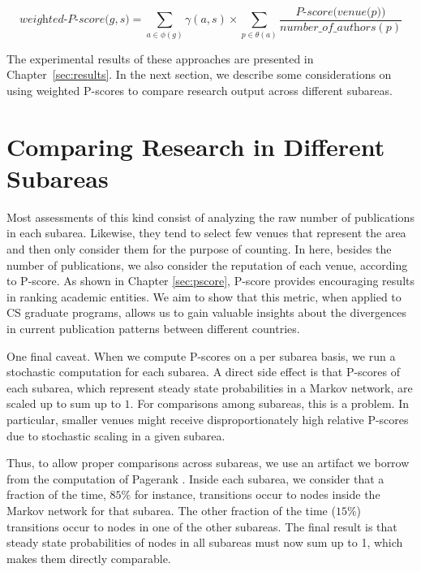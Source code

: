 \documentclass[msc]{ppgccufmg}
\begin{document}
\begin{equation}\label{eq:group_pscore_author_factor}
    \textit{weighted-P-score($g, s$)} = \sum_{a \in \phi(g)} \gamma(a,s) \times \sum_{p \in \theta(a)} \frac{\textit{P-score(venue(p))}}{\textit{number\_of\_authors}(p)}
\end{equation}

The experimental results of these approaches are presented in Chapter~\ref{sec:results}. In the next section, we describe some considerations on using weighted P-scores to compare research output across different subareas.

\section{Comparing Research in Different Subareas}

Most assessments of this kind consist of analyzing the raw number of publications in each subarea. Likewise, they tend to select few venues that represent the area and then only consider them for the purpose of counting. In here, besides the number of publications, we also consider the reputation of each venue, according to P-score. As shown in Chapter \ref{sec:pscore}, P-score provides encouraging results in ranking academic entities. We aim to show that this metric, when applied to CS graduate programs, allows us to gain valuable insights about the divergences in current publication patterns between different countries.

One final caveat. When we compute P-scores on a per subarea basis, we run a stochastic computation for each subarea. A direct side effect is that P-scores of each subarea, which represent steady state probabilities in a Markov network, are scaled up to sum up to $1$. For comparisons among subareas, this is a problem. In particular, smaller venues might receive disproportionately high relative P-scores due to stochastic scaling in a given subarea. 

Thus, to allow proper comparisons across subareas, we use an artifact we borrow from the computation of Pagerank \citep{page98pagerank}. Inside each subarea, we consider that a fraction of the time, $85\%$ for instance, transitions occur to nodes inside the Markov network for that subarea. The other fraction of the time ($15\%$) transitions occur to nodes in one of the other subareas. The final result is that steady state probabilities of nodes in all subareas must now sum up to 1, which makes them directly comparable. 
\end{document}
